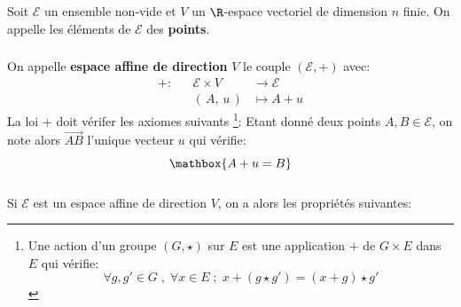 \chapter*{}
Soit \(\mathscr{E}\) un ensemble non-vide et \(V\) un \(\R\)-espace vectoriel de dimension \(n\) finie.\+
On appelle les éléments de \(\mathscr{E}\) des \textbf{points}.

\subsection*{}
On appelle \textbf{espace affine de direction} \(V\) le couple \((\mathscr{E}, +)\) avec:
\[
   \begin{aligned}
      + : &&\mathscr{E} \times V &\longrightarrow \mathscr{E}\\
      &&(\,A, \, u\,) &\longmapsto A + u
   \end{aligned}
\]
La loi + doit vérifer les axiomes suivants 
\footnote{Une action d'un groupe \((G, \star)\) sur \(E\) est une application \(+\) de \(G \times E \) dans \(E\) qui vérifie: \[
   \forall g, g' \in G  \; , \; \forall x \in E \; ; \; x + (g \star g') = (x + g) \star g'
\]}:
Etant donné deux points \(A, B \in \mathscr{E}\), on note alors \(\overrightarrow{AB}\) l'unique vecteur \(u\) qui vérifie:
\[
   \mathbox{A + u = B}   
\]

\subsection*{}
Si \(\mathscr{E}\) est un espace affine de direction \(V\), on a alors les propriétés suivantes:

